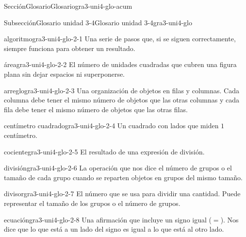 %
%
\typeout{************************************************}
\typeout{************************************************}
%
\begin{sectionptx}{Sección}{Glosario}{}{Glosario}{}{}{gra3-uni4-glo-acum}
%
%
\typeout{************************************************}
\typeout{************************************************}
%
\begin{subsectionptx}{Subsección}{Glosario unidad 3-4}{}{Glosario unidad 3-4}{}{}{gra3-uni4-glo}
%
\begin{descriptionlist}
\begin{dlimedium}{algoritmo}{gra3-uni4-glo-2-1}%
Una serie de pasos que, si se siguen correctamente, siempre funciona para obtener un resultado.%
\end{dlimedium}%
\begin{dlimedium}{área}{gra3-uni4-glo-2-2}%
El número de unidades cuadradas que cubren una figura plana sin dejar espacios ni superponerse.%
\end{dlimedium}%
\begin{dlimedium}{arreglo}{gra3-uni4-glo-2-3}%
Una organización de objetos en filas y columnas. Cada columna debe tener el mismo número de objetos que las otras columnas y cada fila debe tener el mismo número de objetos que las otras filas.%
\end{dlimedium}%
\begin{dlimedium}{centímetro cuadrado}{gra3-uni4-glo-2-4}%
Un cuadrado con lados que miden \(1\) centímetro.%
\end{dlimedium}%
\begin{dlimedium}{cociente}{gra3-uni4-glo-2-5}%
El resultado de una expresión de división.%
\end{dlimedium}%
\begin{dlimedium}{división}{gra3-uni4-glo-2-6}%
La operación que nos dice el número de grupos o el tamaño de cada grupo cuando se reparten objetos en grupos del mismo tamaño.%
\end{dlimedium}%
\begin{dlimedium}{divisor}{gra3-uni4-glo-2-7}%
El número que se usa para dividir una cantidad. Puede representar el tamaño de los grupos o el número de grupos.%
\end{dlimedium}%
\begin{dlimedium}{ecuación}{gra3-uni4-glo-2-8}%
Una afirmación que incluye un signo igual (\(=\)). Nos dice que lo que está a un lado del signo es igual a lo que está al otro lado.%

\end{dlimedium}
\end{descriptionlist}
\end{subsectionptx}
\end{sectionptx}
